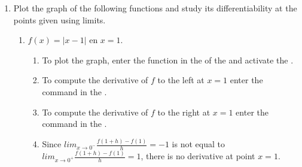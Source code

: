 \begin{enumerate}[leftmargin=*]
% 


\item Plot the graph of the following functions and study its differentiability at the points given using limits.
      \begin{enumerate}
      \item $f(x)=|x-1|$ en $x=1$.

            \begin{indication}
            \begin{enumerate}
            \item To plot the graph, enter the function  in the  of the  and activate the .
            \item To compute the derivative of $f$ to the left at $x=1$ enter the command  in the .
            \item To compute the derivative of $f$ to the right at $x=1$ enter the command  in the .
            \item Since $lim_{x\rightarrow 0^-}\frac{f(1+h)-f(1)}{h}=-1$ is not equal to $lim_{x\rightarrow 0^+}\frac{f(1+h)-f(1)}{h}=1$, there is no derivative at point $x=1$.
            \end{enumerate}
            \end{indication}


\end{enumerate}
\end{enumerate}
